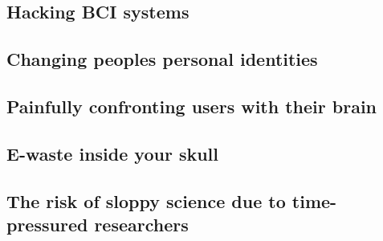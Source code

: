 
\subsection{Hacking BCI systems}
\label{subsec:bci_ethical_hacking}

\lipsum[1]


\subsection{Changing peoples personal identities}
\label{subsec:bci_ethical_identity}

\lipsum[1]


\subsection{Painfully confronting users with their brain}
\label{subsec:bci_ethical_confronting}

\lipsum[1]


\subsection{E-waste inside your skull}
\label{subsec:bci_ethical_e_waste}



\lipsum[1]


\subsection{The risk of sloppy science due to time-pressured researchers}
\label{subsec:bci_ethical_sloppy_science}

